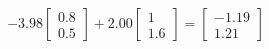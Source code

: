 \documentclass[preview]{standalone}
\begin{document}
\begin{align*}
-3.98 \begin{bmatrix} 0.8 \\ 0.5 \end{bmatrix} + 2.00 \begin{bmatrix} 1 \\ 1.6 \end{bmatrix} = \begin{bmatrix} -1.19 \\ 1.21 \end{bmatrix}
\end{align*}
\end{document}
